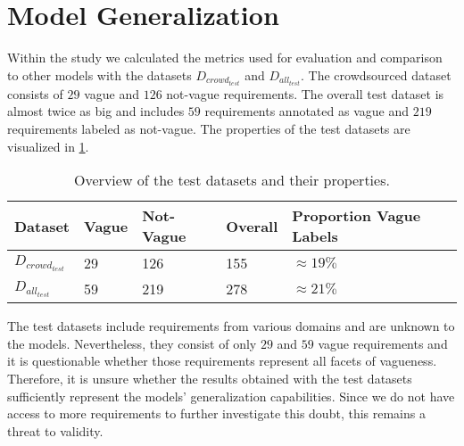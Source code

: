 \section{Model Generalization}
\label{chp:threats_to_validity:sec:model_generalization}

Within the study we calculated the metrics used for evaluation and comparison to other models with the datasets $D_{crowd_{test}}$ and $D_{all_{test}}$.
The crowdsourced dataset consists of $29$ vague and $126$ not-vague requirements.
The overall test dataset is almost twice as big and includes $59$ requirements annotated as vague and $219$ requirements labeled as not-vague.
The properties of the test datasets are visualized in \cref{tab:threats_to_validity:sec:model_generalization:test_datasets}.

\begin{table}[htpb]
    \centering
    \begin{tabular}{l|llll}
        \toprule
        Dataset & Vague & Not-Vague & Overall & Proportion Vague Labels\\
        \midrule
        $D_{crowd_{test}}$ & 29 & 126 & 155 & $\approx19\%$\\
        $D_{all_{test}}$ & 59 & 219 & 278 &  $\approx21\%$\\
        \bottomrule
    \end{tabular}
    \caption[Overview of test datasets]{Overview of the test datasets and their properties.}\label{tab:threats_to_validity:sec:model_generalization:test_datasets}
\end{table}

The test datasets include requirements from various domains \parencite{Kummeth:2020} and are unknown to the models.
Nevertheless, they consist of only $29$ and $59$ vague requirements and it is questionable whether those requirements represent all facets of vagueness.
Therefore, it is unsure whether the results obtained with the test datasets sufficiently represent the models' generalization capabilities.
Since we do not have access to more requirements to further investigate this doubt, this remains a threat to validity.

